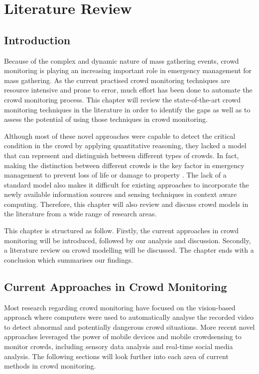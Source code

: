 \chapter{Literature Review}
\label{ch:litReview}
\ifpdf
    \graphicspath{{Chapter2/Figs/Raster/}{Chapter2/Figs/PDF/}{Chapter2/Figs/}}
\else
    \graphicspath{{Chapter2/Figs/Vector/}{Chapter2/Figs/}}
\fi

\section{Introduction}
Because of the complex and dynamic nature of mass gathering events, crowd monitoring is playing an increasing important role in emergency management for mass gathering. As the current practised crowd monitoring techniques are resource intensive and prone to error, much effort has been done to automate the crowd monitoring process. This chapter will review the state-of-the-art crowd monitoring techniques in the literature in order to identify the gaps as well as to assess the potential of using those techniques in crowd monitoring.

Although most of these novel approaches were capable to detect the critical condition in the crowd by applying quantitative reasoning, they lacked a model that can represent and distinguish between different types of crowds. In fact, making the distinction between different crowds is the key factor in emergency management to prevent loss of life or damage to property \parencite{Berlonghi1995}. The lack of a standard model also makes it difficult for existing approaches to incorporate the newly available information sources and sensing techniques in context aware computing. Therefore, this chapter will also review and discuss crowd models in the literature from a wide range of research areas.

This chapter is structured as follow. Firstly, the current approaches in crowd monitoring will be introduced, followed by our analysis and discussion. Secondly, a literature review on crowd modelling will be discussed. The chapter ends with a conclusion which summarises our findings.

\section{Current Approaches in Crowd Monitoring}
Most research regarding crowd monitoring have focused on the vision-based approach where computers were used to automatically analyse the recorded video to detect abnormal and potentially dangerous crowd situations. More recent novel approaches leveraged the power of mobile devices and mobile crowdsensing to monitor crowds, including sensory data analysis and real-time social media analysis. The following sections will look further into each area of current methods in crowd monitoring. 

